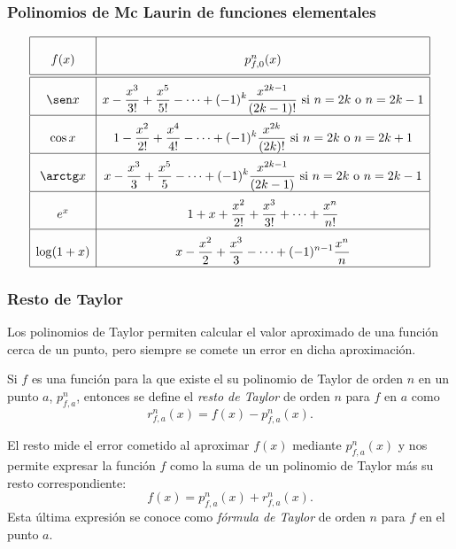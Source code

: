 \begin{frame}
\frametitle{Polinomios de Mc Laurin de funciones elementales}
\[
\renewcommand{\arraystretch}{2.5}
\begin{array}{|c|c|}
\hline
f(x) & p_{f,0}^n(x) \\
\hline\hline
\sen x & \displaystyle x-\frac{x^3}{3!}+\frac{x^5}{5!}-\cdots +(-1)^k\frac{x^{2k-1}}{(2k-1)!} \mbox{ si $n=2k$ o $n=2k-1$}\\
\hline
\cos x &  \displaystyle 1-\frac{x^2}{2!}+\frac{x^4}{4!}-\cdots +(-1)^k\frac{x^{2k}}{(2k)!} \mbox{ si $n=2k$ o $n=2k+1$}\\
\hline
\arctg x &  \displaystyle x-\frac{x^3}{3}+\frac{x^5}{5}-\cdots +(-1)^k\frac{x^{2k-1}}{(2k-1)} \mbox{ si $n=2k$ o $n=2k-1$}\\
\hline
e^x & \displaystyle 1+x+\frac{x^2}{2!}+\frac{x^3}{3!}+\cdots + \frac{x^n}{n!}\\
\hline
\log(1+x) & \displaystyle x-\frac{x^2}{2}+\frac{x^3}{3}-\cdots +(-1)^{n-1}\frac{x^n}{n}\\
\hline
\end{array}
\]
\end{frame}



\begin{frame}
\frametitle{Resto de Taylor}
Los polinomios de Taylor permiten calcular el valor aproximado de una función cerca de un punto, pero siempre se comete un error en dicha aproximación.
\begin{definicion}
Si $f$ es una función para la que existe el su polinomio de Taylor de orden $n$ en un punto $a$, $p_{f,a}^n$, entonces se define el \emph{resto de Taylor} de orden $n$ para $f$ en $a$ como
\[
r_{f,a}^n(x)=f(x)-p_{f,a}^n(x).
\]
\end{definicion}

El resto mide el error cometido al aproximar $f(x)$ mediante $p_{f,a}^n(x)$ y nos permite expresar la función $f$ como la suma de un polinomio de Taylor más su resto correspondiente:
\[
f(x)=p_{f,a}^n(x) + r_{f,a}^n(x).
\]
Esta última expresión se conoce como \emph{fórmula de Taylor} de orden $n$ para $f$ en el punto $a$.
\end{frame}


